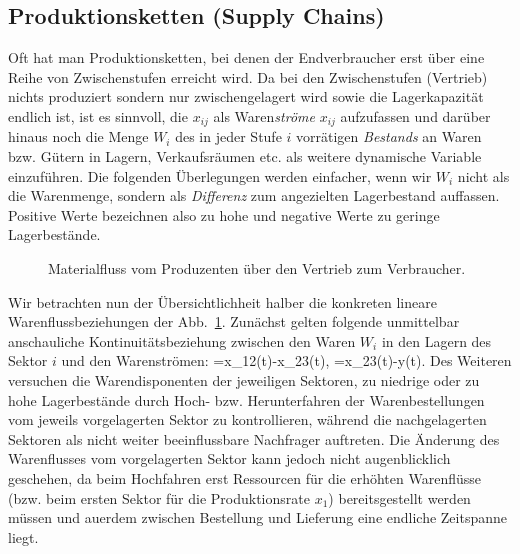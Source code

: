 \subsection{Produktionsketten (Supply Chains)}


Oft hat man Produktionsketten, bei denen der Endverbraucher erst
\"uber eine Reihe von Zwischenstufen erreicht wird. Da bei den
Zwischenstufen (Vertrieb) nichts produziert sondern nur
zwischengelagert wird sowie die Lagerkapazit\"at endlich ist, 
ist es sinnvoll, die $x_{ij}$ als
Waren\emph{str\"ome} $x_{ij}$ aufzufassen und dar\"uber hinaus noch
die Menge $W_i$ des in jeder Stufe $i$ vorr\"atigen 
\textit{Bestands} an Waren bzw. G\"utern
 in Lagern, Verkaufsr\"aumen etc. als weitere
dynamische Variable einzuf\"uhren. Die folgenden \"Uberlegungen werden
einfacher, wenn wir $W_i$ nicht als die Warenmenge, sondern als
\emph{Differenz} zum angezielten Lagerbestand auffassen. Positive
Werte bezeichnen also zu hohe und negative Werte zu geringe Lagerbest\"ande.

\begin{figure}
 \vspace{-4mm}

\caption{\label{fig:supplyChainSketch}Materialfluss vom Produzenten
\"uber den Vertrieb zum Verbraucher. 
}
\end{figure}

Wir betrachten nun der \"Ubersichtlichheit halber die konkreten lineare 
Warenflussbeziehungen der Abb.~\ref{fig:supplyChainSketch}. 
Zun\"achst gelten folgende unmittelbar
anschauliche Kontinuit\"ats\-be\-ziehung zwischen den Waren $W_i$ in den
Lagern des Sektor $i$ und den Warenstr\"omen:
\be
\label{supplyChain-kont}
=x_{12}(t)-x_{23}(t), \quad
{}=x_{23}(t)-y(t).
\ee
Des Weiteren versuchen die Warendisponenten der jeweiligen Sektoren,
zu niedrige oder zu hohe Lagerbest\"ande durch Hoch-
bzw. Herunterfahren der Warenbestellungen vom jeweils vorgelagerten
Sektor zu kontrollieren, w\"ahrend die nachgelagerten Sektoren als
nicht weiter beeinflussbare Nachfrager auftreten. Die \"Anderung des
Warenflusses vom vorgelagerten Sektor kann jedoch nicht augenblicklich
geschehen, da beim Hochfahren erst Ressourcen f\"ur die erh\"ohten
Warenfl\"usse (bzw. beim ersten Sektor f\"ur die Produktionsrate $x_1$)
bereitsgestellt werden m\"ussen und au\3erdem zwischen
Bestellung und Lieferung eine endliche Zeitspanne liegt. 

